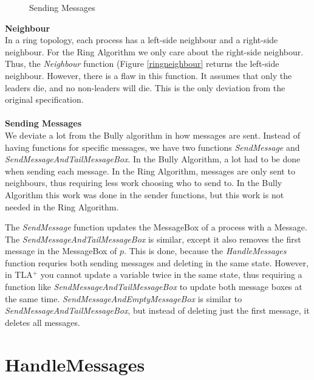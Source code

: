 \documentclass{report}
\begin{document}
\begin{calloutgreen}
\begin{calloutyellow}
\begin{figure}
\@x{}\bottombar\@xx{}%
\caption{Sending Messages}
\label{ringsendingmessages}
\end{figure}

\noindent
\textbf{Neighbour}\\
\noindent
In a ring topology, each process has a left-side neighbour and a right-side neighbour. For the Ring Algorithm we only care about the right-side neighbour. Thus, the \textit{Neighbour} function (Figure \ref{ringneighbour} returns the left-side neighbour. However, there is a flaw in this function. It assumes that only the leaders die, and no non-leaders will die. This is the only deviation from the original specification.
\\\\
\noindent
\textbf{Sending Messages}\\
\noindent
We deviate a lot from the Bully algorithm in how messages are sent. Instead of having functions for specific messages, we have two functions \textit{SendMessage} and \textit{SendMessageAndTailMessageBox}. In the Bully Algorithm, a lot had to be done when sending each message. In the Ring Algorithm, messages are only sent to neighbours, thus requiring less work choosing who to send to. In the Bully Algorithm this work was done in the sender functions, but this work is not needed in the Ring Algorithm.

The \textit{SendMessage} function updates the MessageBox of a process with a Message. The \textit{SendMessageAndTailMessageBox} is similar, except it also removes the first message in the MessageBox of $p$. This is done, because the \textit{HandleMessages} function requries both sending messages and deleting in the same state. However, in TLA$^{+}$ you cannot update a variable twice in the same state, thus requiring a function like \textit{SendMessageAndTailMessageBox} to update both message boxes at the same time. \textit{SendMessageAndEmptyMessageBox} is similar to \textit{SendMessageAndTailMessageBox}, but instead of deleting just the first message, it deletes all messages.






\section{HandleMessages}
\begin{figure}
\tlatex


\end{figure}
\end{calloutyellow}
\end{calloutgreen}
\end{document}
